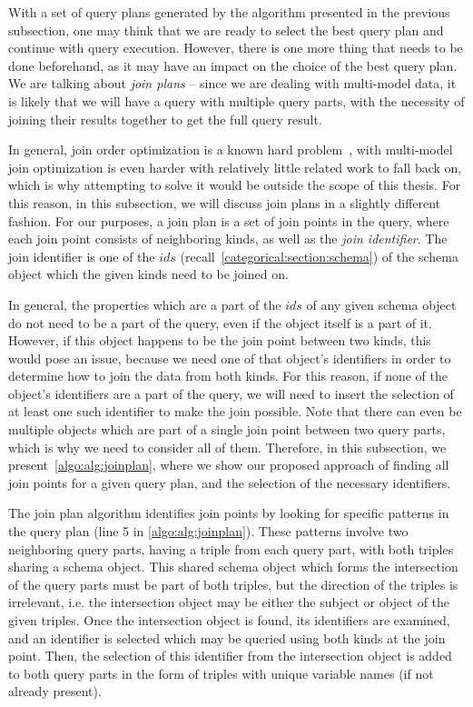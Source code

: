 With a set of query plans generated by the algorithm presented in the previous subsection, one may think that we are ready to select the best query plan and continue with query execution.
However, there is one more thing that needs to be done beforehand, as it may have an impact on the choice of the best query plan.
We are talking about \textit{join plans} -- since we are dealing with multi-model data, it is likely that we will have a query with multiple query parts, with the necessity of joining their results together to get the full query result.

In general, join order optimization is a known hard problem~\cite{join_order}, with multi-model join optimization is even harder with relatively little related work to fall back on, which is why attempting to solve it would be outside the scope of this thesis.
For this reason, in this subsection, we will discuss join plans in a slightly different fashion.
For our purposes, a join plan is a set of join points in the query, where each join point consists of neighboring kinds, as well as the \textit{join identifier}.
The join identifier is one of the $ids$ (recall~\cref{categorical:section:schema}) of the schema object which the given kinds need to be joined on.

In general, the properties which are a part of the $ids$ of any given schema object do not need to be a part of the query, even if the object itself is a part of it.
However, if this object happens to be the join point between two kinds, this would pose an issue, because we need one of that object's identifiers in order to determine how to join the data from both kinds.
For this reason, if none of the object's identifiers are a part of the query, we will need to insert the selection of at least one such identifier to make the join possible.
Note that there can even be multiple objects which are part of a single join point between two query parts, which is why we need to consider all of them.
Therefore, in this subsection, we present~\cref{algo:alg:joinplan}, where we show our proposed approach of finding all join points for a given query plan, and the selection of the necessary identifiers.

The join plan algorithm identifies join points by looking for specific patterns in the query plan (line 5 in \cref{algo:alg:joinplan}).
These patterns involve two neighboring query parts, having a triple from each query part, with both triples sharing a schema object.
This shared schema object which forms the intersection of the query parts must be part of both triples, but the direction of the triples is irrelevant, i.e. the intersection object may be either the subject or object of the given triples.
Once the intersection object is found, its identifiers are examined, and an identifier is selected which may be queried using both kinds at the join point.
Then, the selection of this identifier from the intersection object is added to both query parts in the form of triples with unique variable names (if not already present).

